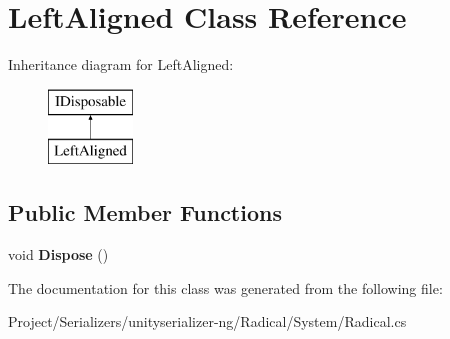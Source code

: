 \hypertarget{class_left_aligned}{}\section{Left\+Aligned Class Reference}
\label{class_left_aligned}
Inheritance diagram for Left\+Aligned\+:\begin{figure}[H]
\begin{center}
\leavevmode
\includegraphics[height=2.000000cm]{class_left_aligned}
\end{center}
\end{figure}
\subsection*{Public Member Functions}
\begin{DoxyCompactItemize}
\item 
\mbox{\label{class_left_aligned_a1dda8d272d06dc5b2c6678072bb122ab}} 
void {\bfseries Dispose} ()
\end{DoxyCompactItemize}


The documentation for this class was generated from the following file\+:\begin{DoxyCompactItemize}
\item 
Project/\+Serializers/unityserializer-\/ng/\+Radical/\+System/Radical.\+cs\end{DoxyCompactItemize}
